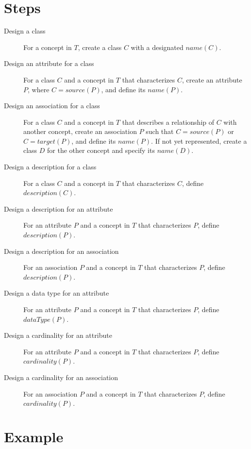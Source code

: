 \section{Steps}
\label{modeling_steps}
\begin{description}
\item [Design a class] For a concept in $T$, create a class $C$ with a designated $name(C)$.

\item[Design an attribute for a class] For a class $C$ and a concept in $T$ that characterizes $C$, create an attribute $P$, where $C = source(P)$, and define its $name(P)$.

\item[Design an association for a class] For a class $C$ and a concept in $T$ that describes a relationship of $C$ with another concept, create an association $P$ such that $C = source(P)$ or $C = target(P)$, and define its $name(P)$. If not yet represented, create a class $D$ for the other concept and specify its $name(D)$.

\item [Design a description for a class] For a class $C$ and a concept in $T$ that characterizes $C$, define $description(C)$.

\item [Design a description for an attribute] For an attribute $P$ and a concept in $T$ that characterizes $P$, define $description(P)$.

\item [Design a description for an association] For an association $P$ and a concept in $T$ that characterizes $P$, define $description(P)$.

\item [Design a data type for an attribute] For an attribute $P$ and a concept in $T$ that characterizes $P$, define $dataType(P)$.

\item [Design a cardinality for an attribute] For an attribute $P$ and a concept in $T$ that characterizes $P$, define $cardinality(P)$.

\item [Design a cardinality for an association] For an association $P$ and a concept in $T$ that characterizes $P$, define $cardinality(P)$.
\end{description}


\section{Example}
\label{sec:simple_domain_description_example}

